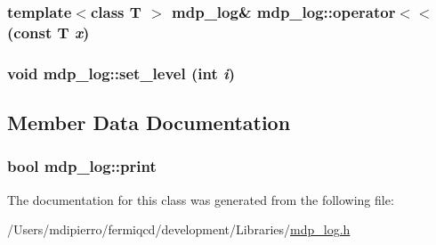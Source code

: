 \label{classmdp__log_a675c488f1e494a9bd3a7466b300ec09a}
\hypertarget{classmdp__log_aa60825a5c02a42c5d1688a60d8da7516}{
\subsubsection[{operator$<$$<$}]{\setlength{\rightskip}{0pt plus 5cm}template$<$class T $>$ {\bf mdp\_\-log}\& mdp\_\-log::operator$<$$<$ (const T {\em x})}}
\label{classmdp__log_aa60825a5c02a42c5d1688a60d8da7516}
\hypertarget{classmdp__log_a368a098416aa38fa3395607848a2c5f1}{
\subsubsection[{set\_\-level}]{\setlength{\rightskip}{0pt plus 5cm}void mdp\_\-log::set\_\-level (int {\em i})}}
\label{classmdp__log_a368a098416aa38fa3395607848a2c5f1}


\subsection{Member Data Documentation}
\hypertarget{classmdp__log_a1330daef61266763f9a736300a1eac49}{
\subsubsection[{print}]{\setlength{\rightskip}{0pt plus 5cm}bool {\bf mdp\_\-log::print}}}
\label{classmdp__log_a1330daef61266763f9a736300a1eac49}


The documentation for this class was generated from the following file:\begin{DoxyCompactItemize}
\item 
/Users/mdipierro/fermiqcd/development/Libraries/\hyperlink{mdp__log_8h}{mdp\_\-log.h}\end{DoxyCompactItemize}
